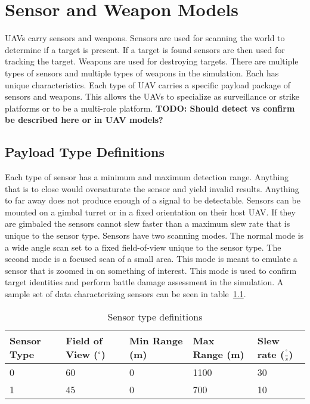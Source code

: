 \chapter{Sensor and Weapon Models}
UAVs carry sensors and weapons.  Sensors are used for scanning the world to determine if a target is present.  If a target is found sensors are then used for tracking the target.  Weapons are used for destroying targets.  There are multiple types of sensors and multiple types of weapons in the simulation.  Each has unique characteristics.  Each type of UAV carries a specific payload package of sensors and weapons.  This allows the UAVs to specialize as surveillance or strike platforms or to be a multi-role platform. \textbf{TODO: Should detect vs confirm be described here or in UAV models?}

\section{Payload Type Definitions}

Each type of sensor has a minimum and maximum detection range.  Anything that is to close would oversaturate the sensor and yield invalid results.  Anything to far away does not produce enough of a signal to be detectable.  Sensors can be mounted on a gimbal turret or in a fixed orientation on their host UAV.  If they are gimbaled the sensors cannot slew faster than a maximum slew rate that is unique to the sensor type.  Sensors have two scanning modes.  The normal mode is a wide angle scan set to a fixed field-of-view unique to the sensor type.  The second mode is a focused scan of a small area.  This mode is meant to emulate a sensor that is zoomed in on something of interest.  This mode is used to confirm target identities and perform battle damage assessment in the simulation.  A sample set of data characterizing sensors can be seen in table~\ref{tab:sensorType}.

\begin{table}[H]
	\caption{Sensor type definitions}
	\centering
	\label{tab:sensorType}
	\begin{tabular}{|p{1cm}|p{1.5cm}|p{1cm}|p{1cm}|p{1.5cm}|}
		\hline
		Sensor Type & Field of View ($^{\circ}$) & Min Range (m) & Max Range (m) & Slew rate ($\frac{^{\circ}}{s}$)\\ \hline
		0 & 60 & 0 & 1100 & 30 \\
		1 & 45 & 0 & 700  & 10 \\
		\hline
	\end{tabular}
\end{table}

